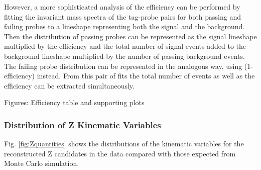 However, a more sophisticated analysis of the efficiency can be performed by fitting the invariant mass spectra of the
tag-probe pairs for both passing and failing probes to a lineshape representing both the signal and the background.  
Then the distribution of passing probes can be represented as the signal lineshape multiplied by the efficiency and the
total number of signal events added to the background lineshape multiplied by the number of passing background events.  
The failing probe distribution can be represented in the analogous way, using (1-efficiency) instead.  
From this pair of fits the total number of events as well as the efficiency can be extracted simultaneously.  

Figures: Efficiency table and supporting plots

\subsubsection{Distribution of Z Kinematic Variables}

Fig. \ref{fig:Zquantities} shows the distributions of the kinematic variables for the reconstructed Z candidates 
in the data compared with those expected from Monte Carlo simulation.  

